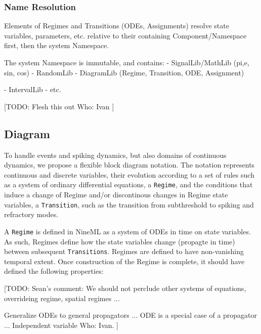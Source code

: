 \documentclass[a4paper]{article}
\newcommand\nmlClass[1]{{\tt #1}}
\begin{document}
\subsubsection{Name Resolution}

Elements of Regimes and Transitions (ODEs, Assignments) resolve state
variables, parameters, etc. relative to their containing
Component/Namespace first, then the system Namespace.

The system Namespace is immutable, and contains:
- SignalLib/MathLib (pi,e, sin, cos)
- RandomLib
- DiagramLib (Regime, Transition, ODE, Assignment)

- IntervalLib
- etc.

[TODO:
Flesh this out
Who: Ivan
]




\subsection{Diagram}


To handle events and spiking dynamics, but also domains of continuous
dynamics, we propose a flexible block diagram notation.  The notation
represents continuous and discrete variables, their evolution
according to a set of rules such as a system of ordinary differential
equations, a \nmlClass{Regime}, and the conditions that induce a change of
Regime and/or discontinous changes in Regime state variables, a
\nmlClass{Transition}, such as the transition from subthreshold to
spiking and refractory modes.


A \nmlClass{Regime} is defined in NineML as a system of ODEs in time on
state variables.  As such, Regimes define how the state variables
change (propagte in time) between subsequent \nmlClass{Transitions}.
Regimes are defined to have non-vanishing temporal extent.  Once
construction of the Regime is complete, it should have defined the
following properties:

[TODO: 
Sean's comment:  
We should not perclude other systems of equations,
overrideing regime, spatial regimes ...

Generalize ODEs to general propagators ... 
ODE is a special case of a propagator ...
Independent variable
Who: Ivan.
]
\end{document}
